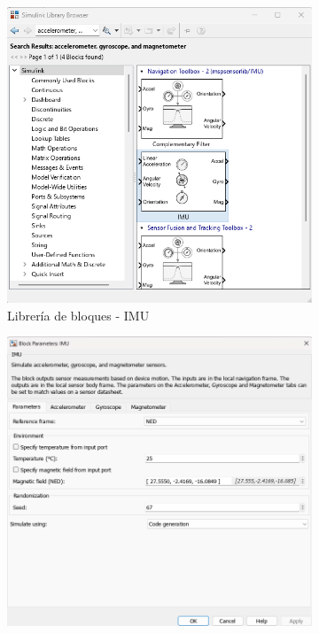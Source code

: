 \begin{figure}[htbp]
    \centering
    \begin{subfigure}[b]{0.35\textwidth}
        \centering
        \includegraphics[width=\textwidth]{fig/Capitulo5/Caso_de_estudio_IMU/Generador_de_archivos/libreria_de_bloques_IMU.png}
        \caption{Librería de bloques - IMU}
        \label{fig:lib_bloques_IMU}
    \end{subfigure}
    \hfill
    \begin{subfigure}[b]{0.45\textwidth}
        \centering
        \includegraphics[width=\textwidth]{fig/Capitulo5/Caso_de_estudio_IMU/Generador_de_archivos/configuracion_parametros_IMU_01.png}

\end{subfigure}
\end{figure}
